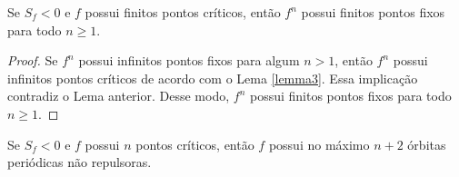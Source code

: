 \begin{lemma}
Se $S_f < 0$ e $f$ possui finitos pontos críticos, então $f^n$ possui finitos pontos fixos para todo $n \geq 1$.
\end{lemma}
\begin{proof}
Se $f^n$ possui infinitos pontos fixos para algum $n > 1$, então $f^n$ possui infinitos pontos críticos de acordo com o Lema \ref{lemma3}. Essa implicação contradiz o Lema anterior. Desse modo, $f^n$ possui finitos pontos fixos para todo $n \geq 1$.
\end{proof}


\begin{theorem}[Singer]
Se $S_f < 0$ e $f$ possui $n$ pontos críticos, então $f$ possui no máximo $n+2$ órbitas periódicas não repulsoras.
\end{theorem}

